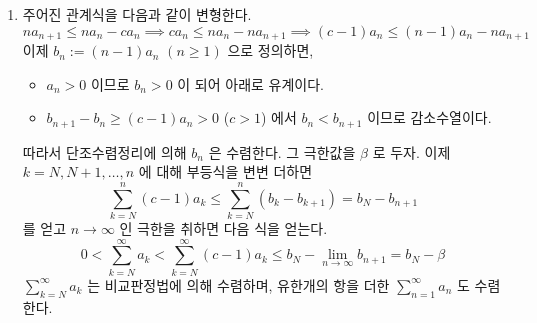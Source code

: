 \documentclass[12pt]{report}
\newcommand{\numl}[1]{\item[\large\textbf{\sffamily #1.}]}
\newcommand{\ra}{\rightarrow}
\newcommand{\imp}{\implies}
\begin{document}
\begin{enumerate}
\numl{8} 주어진 관계식을 다음과 같이 변형한다. $$na_{n+1} \leq na_n-ca_n \imp ca_n \leq na_n - na_{n+1} \imp (c-1)a_n\leq (n-1)a_n-na_{n+1}$$
이제 $b_n := (n-1)a_n$ $(n\geq 1)$ 으로 정의하면,
\begin{itemize}
	\item $a_n>0$ 이므로 $b_n >0$ 이 되어 아래로 유계이다.
	\item $b_{n+1} - b_n \geq (c-1)a_n > 0$ ($c>1$) 에서 $b_n < b_{n+1}$ 이므로 감소수열이다.
\end{itemize}
따라서 단조수렴정리에 의해 $b_n$ 은 수렴한다. 그 극한값을 $\beta$ 로 두자. 이제 $k = N, N+1, \dots, n$ 에 대해 부등식을 변변 더하면
$$\sum_{k=N}^n (c-1)a_k \leq \sum_{k=N}^n(b_k - b_{k+1}) = b_N-b_{n+1}$$ 를 얻고 $n\ra \infty$ 인 극한을 취하면 다음 식을 얻는다.
$$0 < \sum_{k=N}^\infty a_k < \sum_{k=N}^\infty (c-1)a_k \leq b_N-\lim_{n\ra \infty} b_{n+1} = b_N-\beta $$
$\sum_{k=N}^\infty a_k$ 는 비교판정법에 의해 수렴하며, 유한개의 항을 더한 $\sum_{n=1}^\infty a_n$ 도 수렴한다.

\end{enumerate}
\end{document}
